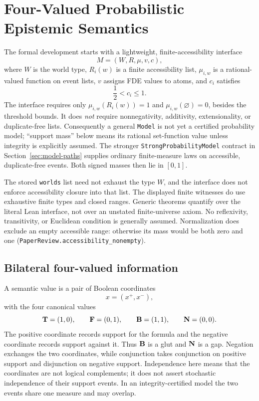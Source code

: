 \section{Four-Valued Probabilistic Epistemic Semantics}
\label{sec:kernel}

The formal development starts with a lightweight, finite-accessibility interface
\[
  M=(W,R,\mu,v,c),
\]
where \(W\) is the world type, \(R_i(w)\) is a finite accessibility list, \(\mu_{i,w}\) is a rational-valued function on event lists, \(v\) assigns FDE values to atoms, and \(c_i\) satisfies
\[
  \frac12<c_i\le 1.
\]
The interface requires only \(\mu_{i,w}(R_i(w))=1\) and
\(\mu_{i,w}(\varnothing)=0\), besides the threshold bounds. It does \emph{not}
require nonnegativity, additivity, extensionality, or duplicate-free lists.
Consequently a general \texttt{Model} is not yet a certified probability model;
``support mass'' below means its rational set-function value unless integrity
is explicitly assumed. The stronger \texttt{StrongProbabilityModel} contract
in Section~\ref{sec:model-paths} supplies ordinary finite-measure laws on
accessible, duplicate-free events. Both signed masses then lie in \([0,1]\).

The stored \texttt{worlds} list need not exhaust the type \(W\), and the interface
does not enforce accessibility closure into that list. The displayed finite
witnesses do use exhaustive finite types and closed ranges. Generic theorems
quantify over the literal Lean interface, not over an unstated finite-universe
axiom. No reflexivity, transitivity, or Euclidean condition is generally assumed.
Normalization does exclude an empty accessible range: otherwise its mass would
be both zero and one (\texttt{PaperReview.accessibility\_nonempty}).

\subsection{Bilateral four-valued information}

A semantic value is a pair of Boolean coordinates
\[
  x=(x^+,x^-),
\]
with the four canonical values
\[
  \mathbf{T}=(1,0),\qquad
  \mathbf{F}=(0,1),\qquad
  \mathbf{B}=(1,1),\qquad
  \mathbf{N}=(0,0).
\]
The positive coordinate records support for the formula and the negative coordinate records support against it. Thus \(\mathbf{B}\) is a glut and \(\mathbf{N}\) is a gap. Negation exchanges the two coordinates, while conjunction takes conjunction on positive support and disjunction on negative support. Independence here means that the coordinates are not logical complements; it does not assert stochastic independence of their support events. In an integrity-certified model the two events share one measure and may overlap.

